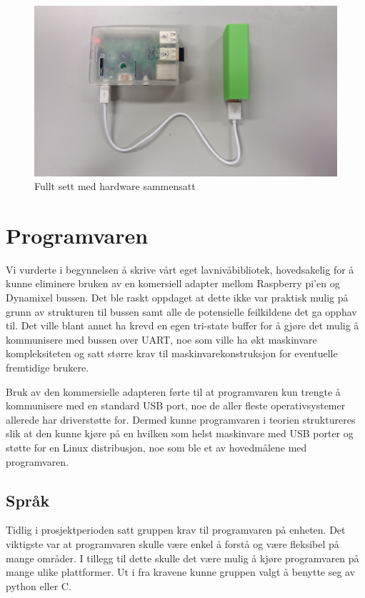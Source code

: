 \documentclass[12pt]{report}
\begin{document}
\begin{figure}[H]
	\includegraphics[scale=0.07]{imgs/assembled}
	\centering
	\caption{Fullt sett med hardware sammensatt}
	\label{fllsett}
\end{figure}

\section{Programvaren}
Vi vurderte i begynnelsen å skrive vårt eget lavnivåbibliotek, hovedsakelig for å kunne eliminere bruken av en komersiell adapter mellom Raspberry pi’en og Dynamixel bussen. Det ble raskt oppdaget at dette ikke var praktisk mulig på grunn av strukturen til bussen samt alle de potensielle feilkildene det ga opphav til. Det ville blant annet ha krevd en egen tri-state buffer for å gjøre det mulig å kommunisere med bussen over UART, noe som ville ha økt maskinvare kompleksiteten og satt større krav til maskinvarekonstruksjon for eventuelle fremtidige brukere.

Bruk av den kommersielle adapteren førte til at programvaren kun trengte å kommunisere med en standard USB port, noe de aller fleste operativsystemer allerede har driverstøtte for. Dermed kunne programvaren i teorien struktureres slik at den kunne kjøre på en hvilken som helst maskinvare med USB porter og støtte for en Linux distribusjon, noe som ble et av hovedmålene med programvaren.

\subsection{Språk}
Tidlig i prosjektperioden satt gruppen krav til programvaren på enheten. Det viktigste var at programvaren skulle være enkel å forstå og være fleksibel på mange områder. I tillegg til dette skulle det være mulig å kjøre programvaren på mange ulike plattformer. Ut i fra kravene kunne gruppen valgt å benytte seg av python eller C. 
\end{document}
